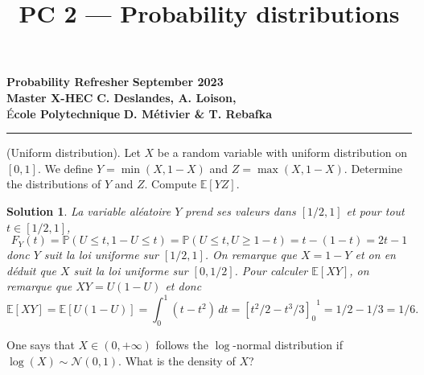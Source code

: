 \documentclass{article}
\title{PC 2 --- Probability distributions}
\author{}
\date{}
\newtheorem{solution}{Solution}
\begin{document}
\begin{flushleft}
  \textbf{Probability Refresher} \hfill \textbf{September 2023} \\
  \textbf{Master X-HEC} \hfill \textbf{C. Deslandes, A. Loison,} \\
  É\textbf{cole Polytechnique} \hfill \textbf{D. Métivier \& T. Rebafka}
\end{flushleft}

{\let\newpage\relax\maketitle}
\vspace{-1.3cm}
\hrule

\vspace{0.5cm}

\begin{Exercise} (Uniform distribution). Let $X$ be a random variable with uniform distribution on $[0,1]$. We define $Y=\min (X, 1-X)$ and $Z=\max (X, 1-X)$. Determine the distributions of $Y$ and $Z$. Compute $\mathbb{E}[Y Z]$.
\end{Exercise}

\begin{solution}
  La variable al\'{e}atoire $Y$ prend ses valeurs dans $[1/2,1]$ et pour tout $t\in[1/2,1]$,
  \[
    F_Y(t) = \mathbb{P}(U\leq t,1-U\leq t) = \mathbb{P}(U\leq t,U\geq 1-t)
    = t - (1-t) = 2t-1
  \]
  donc $Y$ suit la loi uniforme sur $[1/2,1]$. On remarque que $X = 1-Y$ et on en
  d\'{e}duit que $X$ suit la loi uniforme sur $[0,1/2]$. Pour calculer
  $\mathbb{E}[XY]$, on remarque que $XY = U(1-U)$ et donc
  \[
    \mathbb{E}[XY]
    = \mathbb{E}[U(1-U)]
    = \int_0^{1}\!(t-t^2)\,dt
      = {{[t^2/2-t^3/3]}_0}^{1}
    = 1/2-1/3=1/6.
  \]
\end{solution}

\begin{Exercise}
  One says that $X \in (0,+\infty)$ follows the $\log$-normal distribution if $\log (X) \sim \mathcal{N}(0,1)$. What is the density of $X$?
\end{Exercise}
\end{document}

